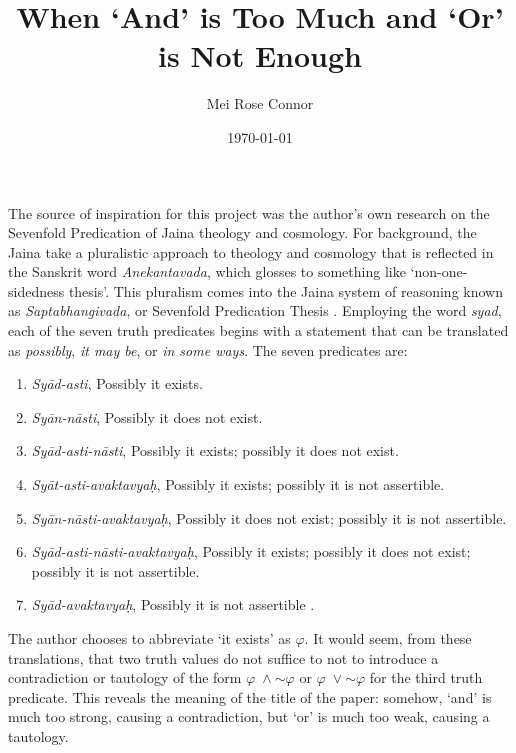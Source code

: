 \documentclass[12pt]{article}
\renewcommand{\phi}{\varphi}
\newcommand{\lognot}{\ensuremath{\sim \!}}
\begin{document}
\title{When `And' is Too Much and `Or' is Not Enough}
\author{Mei Rose Connor}
\date{\today}

\maketitle

The source of inspiration for this project was the author's own research on the Sevenfold Predication of Jaina theology and cosmology. For background,
the Jaina take a pluralistic approach to theology and cosmology that is reflected in the Sanskrit word \emph{Anekantavada}, which glosses to something like `non-one-sidedness
thesis'. This pluralism comes into the Jaina system of reasoning known as \emph{Saptabhangivada}, or Sevenfold Predication Thesis \cite{Burch1964}. Employing the word \emph{syad}, each of the
seven truth predicates begins with a statement that can be translated as \emph{possibly}, \emph{it may be}, or \emph{in some ways}. The seven predicates are:

\begin{enumerate}[noitemsep]
    \item \emph{Syād-asti}, Possibly it exists.
    \item \emph{Syān-nāsti}, Possibly it does not exist.
    \item \emph{Syād-asti-nāsti}, Possibly it exists; possibly it does not exist.
    \item \emph{Syāt-asti-avaktavya\d{h}}, Possibly it exists; possibly it is not assertible.
    \item \emph{Syān-nāsti-avaktavya\d{h}}, Possibly it does not exist; possibly it is not assertible.
    \item \emph{Syād-asti-nāsti-avaktavya\d{h}}, Possibly it exists; possibly it does not exist; possibly it is not assertible.
    \item \emph{Syād-avaktavya\d{h}}, Possibly it is not assertible \cite{Ganeri2002}.
\end{enumerate}


The author chooses to abbreviate `it exists' as $\phi$.
It would seem, from these translations, that two truth values do not suffice to not to introduce a contradiction or 
tautology of the form $\phi \; \wedge \lognot \phi$ or  $\phi \; \vee \lognot \phi$ for the third truth predicate.  This reveals the meaning of the title of the paper: somehow,
`and' is much too strong, causing a contradiction, but `or' is much too weak, causing a tautology. 
\end{document}
